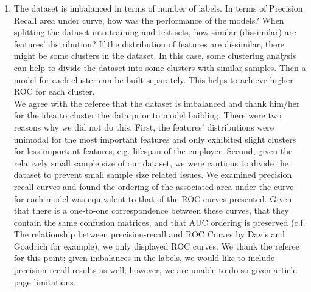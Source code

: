 \documentclass{amsart}[12pt]
\begin{document}
\begin{enumerate}
        \hspace{10pt}
    \item   {\color{blue} 
        The dataset is imbalanced in terms of number of labels. In terms of Precision Recall area under curve, how was the performance of the models? When splitting the dataset into training and test sets, how similar (dissimilar) are features' distribution? If the distribution of features are dissimilar, there might be some clusters in the dataset. In this case, some clustering analysis can help to divide the dataset into some clusters with similar samples. Then a model for each cluster can be built separately. This helps to achieve higher ROC for each cluster.
        }\\

        We agree with the referee that the dataset is imbalanced and thank him/her for the idea to cluster 
        the data prior to model building.  There were two reasons why we did not do this.  First, 
        the features' distributions were unimodal for the most important features and only 
        exhibited slight clusters for less important features, e.g. lifespan of the employer.
        Second, given the relatively small sample size of our dataset, we were cautious to 
        divide the dataset to prevent small sample size related issues. We examined precision recall curves 
        and found the ordering of the associated area under the curve for each model was equivalent 
        to that of the ROC curves presented. Given that there is a one-to-one correspondence
        between these curves, that they contain the same confusion matrices, and that 
        AUC ordering is preserved (c.f. The relationship between precision-recall and ROC Curves by Davis and 
        Goadrich for example), we only displayed ROC curves.  We thank the referee for this point; given 
        imbalances in the labels, we would like to include precision recall results as well; however, we 
        are unable to do so given article page limitations. 
\end{enumerate}
\end{document}
